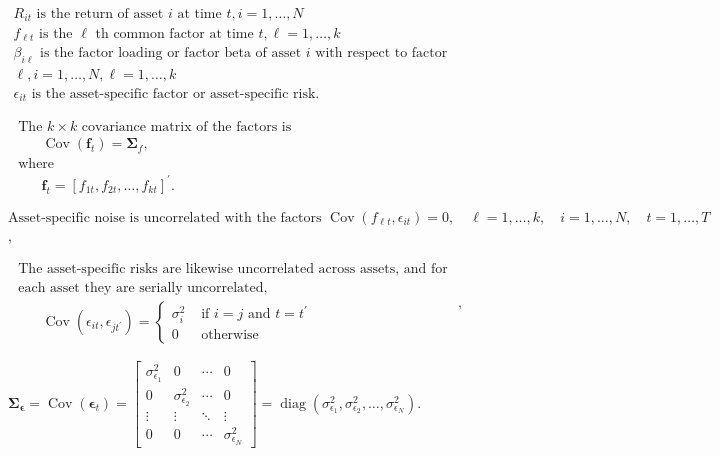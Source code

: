 \documentclass[11pt]{article}
\begin{document}
\(\begin{array}{l}{R_{i t} \text { is the return of asset } i \text { at time } t, i=1, \ldots, N} \\ {f_{\ell t} \text { is the } \ell \text { th common factor at time } t, \ell=1, \ldots, k} \\ {\beta_{i \ell} \text { is the factor loading or factor beta of asset } i \text { with respect to factor }} \\ {\ell, i=1, \ldots, N, \ell=1, \ldots, k} \\ {\epsilon_{i t} \text { is the asset-specific factor or asset-specific risk. }}\end{array}\)

\(\begin{array}{l}{\text { The } k \times k \text { covariance matrix of the factors is }} \\ {\qquad \operatorname{Cov}\left(\boldsymbol{f}_{t}\right)=\boldsymbol{\Sigma}_{f},} \\ {\text { where }} \\ {\qquad \boldsymbol{f}_{t}=\left[f_{1 t}, f_{2 t}, \ldots, f_{k t}\right]^{\prime}.}\end{array}\)

\(\text {Asset-specific noise is uncorrelated with the factors } \operatorname{Cov}\left(f_{\ell t}, \epsilon_{i t}\right)=0, \quad \ell=1, \ldots, k, \quad i=1, \ldots, N, \quad t=1, \ldots, T\),

\(\begin{array}{l}{\text { The asset-specific risks are likewise uncorrelated across assets, and for }} \\ {\text { each asset they are serially uncorrelated, }} \\ {\qquad \operatorname{Cov}\left(\epsilon_{i t}, \epsilon_{j t^{\prime}}\right)=\left\{\begin{array}{ll}{\sigma_{i}^{2}} & {\text { if } i=j \text { and } t=t^{\prime}} \\ {0} & {\text { otherwise }}\end{array}\right.}\end{array},\)

\(\boldsymbol{\Sigma}_{\boldsymbol{\epsilon}}=\operatorname{Cov}\left(\boldsymbol{\epsilon}_{t}\right)=\left[\begin{array}{cccc}{\sigma_{\epsilon_{1}}^{2}} & {0} & {\cdots} & {0} \\ {0} & {\sigma_{\epsilon_{2}}^{2}} & {\cdots} & {0} \\ {\vdots} & {\vdots} & {\ddots} & {\vdots} \\ {0} & {0} & {\cdots} & {\sigma_{\epsilon_{N}}^{2}}\end{array}\right]=\operatorname{diag}\left(\sigma_{\epsilon_{1}}^{2}, \sigma_{\epsilon_{2}}^{2}, \ldots, \sigma_{\epsilon_{N}}^{2}\right).\)
\end{document}
